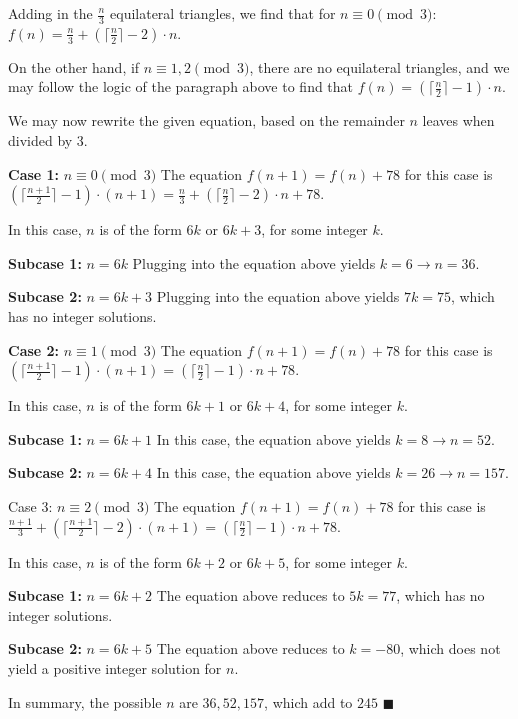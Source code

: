 \documentclass[a4paper,11pt]{article}
\begin{document}
Adding in the $\frac{n}{3}$ equilateral triangles, we find that for $n\equiv 0\pmod 3$: $f(n) = \frac{n}{3}+\left(\lceil \frac{n}{2} \rceil -2\right)\cdot n$.

On the other hand, if $n\equiv 1, 2\pmod 3$, there are no equilateral triangles, and we may follow the logic of the paragraph above to find that $f(n)=\left(\lceil \frac{n}{2} \rceil -1\right)\cdot n$.

We may now rewrite the given equation, based on the remainder $n$ leaves when divided by 3.


\textbf{Case 1:} $n\equiv 0\pmod 3$ The equation $f(n+1)=f(n)+78$ for this case is $\left(\lceil \frac{n+1}{2} \rceil -1\right)\cdot (n+1)=\frac{n}{3}+\left(\lceil \frac{n}{2} \rceil -2\right)\cdot n+78$.

In this case, $n$ is of the form $6k$ or $6k+3$, for some integer $k$.

\textbf{Subcase 1:} $n=6k$ Plugging into the equation above yields $k=6\rightarrow n=36$.

\textbf{Subcase 2:} $n=6k+3$ Plugging into the equation above yields $7k=75$, which has no integer solutions.

\textbf{Case 2:} $n\equiv 1\pmod 3$ The equation $f(n+1)=f(n)+78$ for this case is $\left(\lceil \frac{n+1}{2} \rceil -1\right)\cdot (n+1)=\left(\lceil \frac{n}{2} \rceil -1\right)\cdot n+78$.

In this case, $n$ is of the form $6k+1$ or $6k+4$, for some integer $k$.

\textbf{Subcase 1:} $n=6k+1$ In this case, the equation above yields $k=8\rightarrow n=52$.

\textbf{Subcase 2: }$n=6k+4$ In this case, the equation above yields $k=26\rightarrow n=157$.

Case 3: $n\equiv 2\pmod 3$ The equation $f(n+1)=f(n)+78$ for this case is $\frac{n+1}{3}+\left(\lceil \frac{n+1}{2} \rceil -2\right)\cdot (n+1)=\left(\lceil \frac{n}{2} \rceil -1\right)\cdot n+78$.

In this case, $n$ is of the form $6k+2$ or $6k+5$, for some integer $k$.

\textbf{Subcase 1:} $n=6k+2$ The equation above reduces to $5k=77$, which has no integer solutions.

\textbf{Subcase 2:} $n=6k+5$ The equation above reduces to $k=-80$, which does not yield a positive integer solution for $n$.

In summary, the possible $n$ are $36, 52, 157$, which add to $\boxed{245}$ \hfill $\blacksquare$
\end{document}
